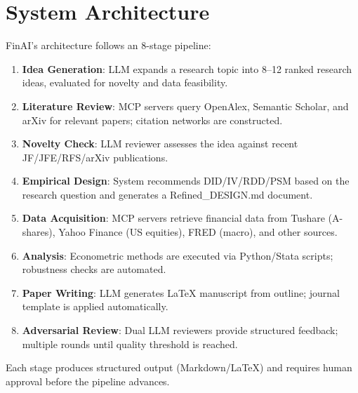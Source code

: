 \documentclass[12pt, a4paper]{article}
\begin{document}
\section{System Architecture}

FinAI's architecture follows an 8-stage pipeline:

\begin{enumerate}
    \item \textbf{Idea Generation}: LLM expands a research topic into 8--12 ranked research ideas, evaluated for novelty and data feasibility.
    \item \textbf{Literature Review}: MCP servers query OpenAlex, Semantic Scholar, and arXiv for relevant papers; citation networks are constructed.
    \item \textbf{Novelty Check}: LLM reviewer assesses the idea against recent JF/JFE/RFS/arXiv publications.
    \item \textbf{Empirical Design}: System recommends DID/IV/RDD/PSM based on the research question and generates a Refined\_DESIGN.md document.
    \item \textbf{Data Acquisition}: MCP servers retrieve financial data from Tushare (A-shares), Yahoo Finance (US equities), FRED (macro), and other sources.
    \item \textbf{Analysis}: Econometric methods are executed via Python/Stata scripts; robustness checks are automated.
    \item \textbf{Paper Writing}: LLM generates LaTeX manuscript from outline; journal template is applied automatically.
    \item \textbf{Adversarial Review}: Dual LLM reviewers provide structured feedback; multiple rounds until quality threshold is reached.
\end{enumerate}

Each stage produces structured output (Markdown/LaTeX) and requires human approval before the pipeline advances.
\end{document}
